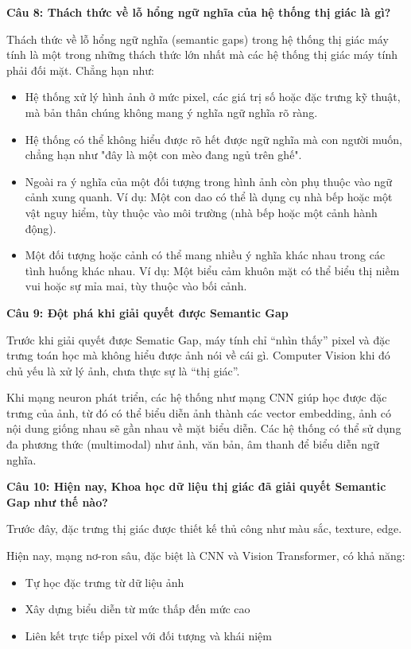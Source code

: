 \textbf{Câu 8: Thách thức về lỗ hổng ngữ nghĩa của hệ thống thị giác là gì?}

Thách thức về lỗ hổng ngữ nghĩa (semantic gaps) trong hệ thống thị giác máy tính là một trong những thách thức lớn nhất mà các hệ thống thị giác máy tính phải đối mặt. Chẳng hạn như:

\begin{itemize}
	\item Hệ thống xử lý hình ảnh ở mức pixel, các giá trị số hoặc đặc trưng kỹ thuật, mà bản thân chúng không mang ý nghĩa ngữ nghĩa rõ ràng.
	
	\item Hệ thống có thể không hiểu được rõ hết được ngữ nghĩa mà con người muốn, chẳng hạn như "đây là một con mèo đang ngủ trên ghế".
	
	\item Ngoài ra ý nghĩa của một đối tượng trong hình ảnh còn phụ thuộc vào ngữ cảnh xung quanh. Ví dụ: Một con dao có thể là dụng cụ nhà bếp hoặc một vật nguy hiểm, tùy thuộc vào môi trường (nhà bếp hoặc một cảnh hành động).
	
	\item Một đối tượng hoặc cảnh có thể mang nhiều ý nghĩa khác nhau trong các tình huống khác nhau. Ví dụ: Một biểu cảm khuôn mặt có thể biểu thị niềm vui hoặc sự mỉa mai, tùy thuộc vào bối cảnh.
\end{itemize}

\textbf{Câu 9: Đột phá khi giải quyết được Semantic Gap}

Trước khi giải quyết được Sematic Gap, máy tính chỉ “nhìn thấy” pixel và đặc trưng toán học mà không hiểu được ảnh nói về cái gì. Computer Vision khi đó chủ yếu là xử lý ảnh, chưa thực sự là “thị giác”.

Khi mạng neuron phát triển, các hệ thống như mạng CNN giúp học được đặc trưng của ảnh, từ đó có thể biểu diễn ảnh thành các vector embedding, ảnh có nội dung giống nhau sẽ gần nhau về mặt biểu diễn. Các hệ thống có thể sử dụng đa phương thức (multimodal) như ảnh, văn bản, âm thanh để biểu diễn ngữ nghĩa.

\textbf{Câu 10: Hiện nay, Khoa học dữ liệu thị giác đã giải quyết Semantic Gap như thế nào?}

Trước đây, đặc trưng thị giác được thiết kế thủ công như màu sắc, texture, edge.

Hiện nay, mạng nơ-ron sâu, đặc biệt là CNN và Vision Transformer, có khả năng:

\begin{itemize}
	\item Tự học đặc trưng từ dữ liệu ảnh
	
	\item Xây dựng biểu diễn từ mức thấp đến mức cao
	
	\item Liên kết trực tiếp pixel với đối tượng và khái niệm
\end{itemize}

